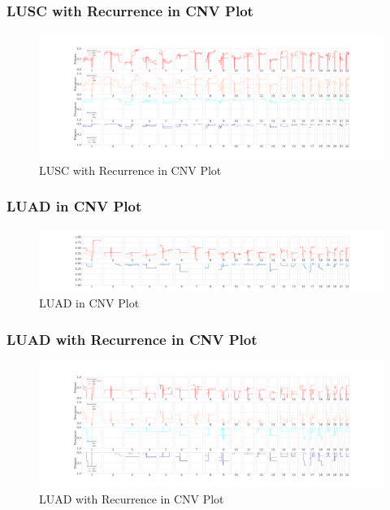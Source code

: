 \documentclass{beamer}
\begin{document}
    \begin{frame}
        \frametitle{LUSC with Recurrence in CNV Plot}

        \begin{figure}
            \includegraphics[width=\linewidth]{figures/Sequenza/BWA-simple-SQC.Recurrence.pdf}
            \caption{LUSC with Recurrence in CNV Plot}
        \end{figure}
    \end{frame}

    \begin{frame}
        \frametitle{LUAD in CNV Plot}

        \begin{figure}
            \includegraphics[width=\linewidth]{figures/Sequenza/BWA-simple-ADC.pdf}
            \caption{LUAD in CNV Plot}
        \end{figure}
    \end{frame}

    \begin{frame}
        \frametitle{LUAD with Recurrence in CNV Plot}

        \begin{figure}
            \includegraphics[width=\linewidth]{figures/Sequenza/BWA-simple-ADC.Recurrence.pdf}
            \caption{LUAD with Recurrence in CNV Plot}
        \end{figure}
    \end{frame}
\end{document}

